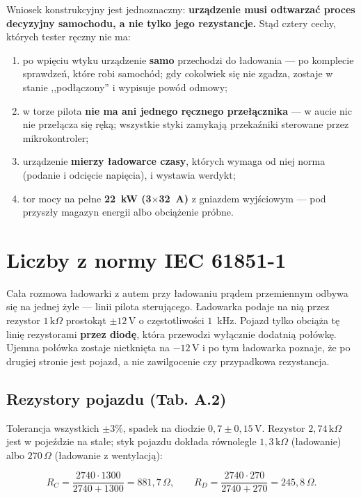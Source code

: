 \documentclass[a4paper,11pt]{article}
\newcommand{\ohm}{\,\Omega}
\newcommand{\kohm}{\,\mathrm{k}\Omega}
\newcommand{\volt}{\,\mathrm{V}}
\begin{document}
Wniosek konstrukcyjny jest jednoznaczny: \textbf{urządzenie musi odtwarzać proces
decyzyjny samochodu, a nie tylko jego rezystancje.} Stąd cztery cechy, których
tester ręczny nie ma:

\begin{enumerate}
\item po wpięciu wtyku urządzenie \textbf{samo} przechodzi do ładowania --- po
      komplecie sprawdzeń, które robi samochód; gdy cokolwiek się nie zgadza,
      zostaje w stanie ,,podłączony'' i wypisuje powód odmowy;
\item w torze pilota \textbf{nie ma ani jednego ręcznego przełącznika} --- w aucie
      nic nie przełącza się ręką; wszystkie styki zamykają przekaźniki sterowane
      przez mikrokontroler;
\item urządzenie \textbf{mierzy ładowarce czasy}, których wymaga od niej norma
      (podanie i odcięcie napięcia), i wystawia werdykt;
\item tor mocy na pełne \textbf{22~kW (3$\times$32~A)} z gniazdem wyjściowym ---
      pod przyszły magazyn energii albo obciążenie próbne.
\end{enumerate}

\section{Liczby z normy IEC 61851-1}

Cała rozmowa ładowarki z autem przy ładowaniu prądem przemiennym odbywa się na
jednej żyle --- linii pilota sterującego. Ładowarka podaje na nią przez rezystor
$1\kohm$ prostokąt $\pm 12\volt$ o częstotliwości $1$~kHz. Pojazd tylko obciąża tę
linię rezystorami \textbf{przez diodę}, która przewodzi wyłącznie dodatnią połówkę.
Ujemna połówka zostaje nietknięta na $-12\volt$ i po tym ładowarka poznaje, że po
drugiej stronie jest pojazd, a nie zawilgocenie czy przypadkowa rezystancja.

\subsection{Rezystory pojazdu (Tab. A.2)}

Tolerancja wszystkich $\pm 3\%$, spadek na diodzie $0{,}7 \pm 0{,}15\volt$.
Rezystor $2{,}74\kohm$ jest w pojeździe na stałe; styk pojazdu dokłada równolegle
$1{,}3\kohm$ (ładowanie) albo $270\ohm$ (ładowanie z wentylacją):

\[
R_{C}=\frac{2740\cdot 1300}{2740+1300}=881{,}7\ohm,
\qquad
R_{D}=\frac{2740\cdot 270}{2740+270}=245{,}8\ohm .
\]
\end{document}
